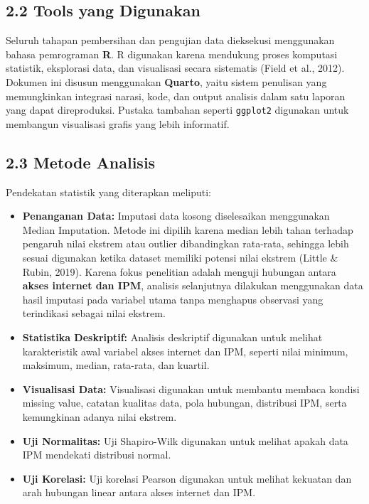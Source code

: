 \documentclass[
  indonesian,
  letterpaper,
  DIV=11,
  numbers=noendperiod]{scrartcl}
\begin{document}
\subsection{2.2 Tools yang Digunakan}\label{tools-yang-digunakan}

Seluruh tahapan pembersihan dan pengujian data dieksekusi menggunakan
bahasa pemrograman \textbf{R}. R digunakan karena mendukung proses
komputasi statistik, eksplorasi data, dan visualisasi secara sistematis
(Field et al., 2012). Dokumen ini disusun menggunakan \textbf{Quarto},
yaitu sistem penulisan yang memungkinkan integrasi narasi, kode, dan
output analisis dalam satu laporan yang dapat direproduksi. Pustaka
tambahan seperti \texttt{ggplot2} digunakan untuk membangun visualisasi
grafis yang lebih informatif.

\subsection{2.3 Metode Analisis}\label{metode-analisis}

Pendekatan statistik yang diterapkan meliputi:

\begin{itemize}
\item
  \textbf{Penanganan Data:} Imputasi data kosong diselesaikan
  menggunakan Median Imputation. Metode ini dipilih karena median lebih
  tahan terhadap pengaruh nilai ekstrem atau outlier dibandingkan
  rata-rata, sehingga lebih sesuai digunakan ketika dataset memiliki
  potensi nilai ekstrem (Little \& Rubin, 2019). Karena fokus penelitian
  adalah menguji hubungan antara \textbf{akses internet dan IPM},
  analisis selanjutnya dilakukan menggunakan data hasil imputasi pada
  variabel utama tanpa menghapus observasi yang terindikasi sebagai
  nilai ekstrem.
\item
  \textbf{Statistika Deskriptif:} Analisis deskriptif digunakan untuk
  melihat karakteristik awal variabel akses internet dan IPM, seperti
  nilai minimum, maksimum, median, rata-rata, dan kuartil.
\item
  \textbf{Visualisasi Data:} Visualisasi digunakan untuk membantu
  membaca kondisi missing value, catatan kualitas data, pola hubungan,
  distribusi IPM, serta kemungkinan adanya nilai ekstrem.
\item
  \textbf{Uji Normalitas:} Uji Shapiro-Wilk digunakan untuk melihat
  apakah data IPM mendekati distribusi normal.
\item
  \textbf{Uji Korelasi:} Uji korelasi Pearson digunakan untuk melihat
  kekuatan dan arah hubungan linear antara akses internet dan IPM.
\end{itemize}
\end{document}
